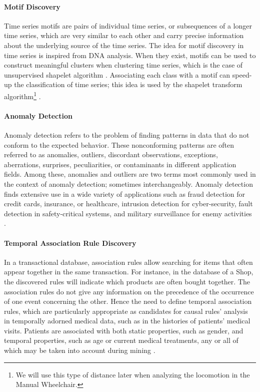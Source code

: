 \paragraph{Motif Discovery}
Time series motifs are pairs of individual time series, or subsequences of a longer time series, which are very similar to each other and carry precise information about the underlying source of the time series. The idea for motif discovery in time series is inspired from DNA analysis. When they exist, motifs can be used to construct meaningful clusters when clustering time series, which is the case of unsupervised shapelet algorithm \cite{ulanova2015scalable}. Associating each class with a motif can speed-up the classification of time series; this idea is used by the shapelet transform algorithm\footnote{We will use this type of distance later when analyzing the locomotion in the Manual Wheelchair.} \cite{lines2012shapelet}.

\paragraph{Anomaly Detection}
Anomaly detection refers to the problem of finding patterns in data that do not conform to the expected behavior. These nonconforming patterns are often referred to as anomalies, outliers, discordant observations, exceptions, aberrations, surprises, peculiarities, or contaminants in different application fields. Among these, anomalies and outliers are two terms  most commonly used in the context of anomaly detection; sometimes interchangeably. Anomaly detection finds extensive use in a wide variety of applications such as fraud detection for credit cards, insurance, or healthcare, intrusion detection for cyber-security, fault detection in safety-critical systems, and military surveillance for enemy activities \cite{chandola2009anomaly}.

\paragraph{Temporal Association Rule Discovery}
In a transactional database, association rules allow searching for items that often appear together in the same transaction. For instance, in the database of a Shop, the discovered rules will indicate which products are often bought together. The association rules do not give any information on the precedence of the occurrence of one event concerning the other. Hence the need to define temporal association rules,  which are particularly appropriate as candidates for causal rules' analysis in temporally adorned medical data, such as in the histories of patients' medical visits. Patients are associated with both static properties, such as gender, and temporal properties, such as age or current medical treatments, any or all of which may be taken into account during mining \cite{Vasimalla2017}.

